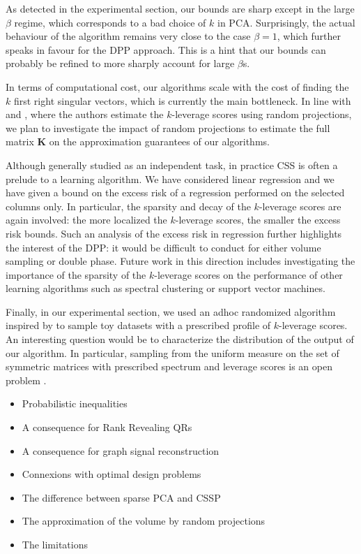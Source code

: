 \documentclass[twoside,11pt]{book}
\numberwithin{theorem}{chapter}
\numberwithin{definition}{chapter}
\numberwithin{proposition}{chapter}
\numberwithin{corollary}{chapter}
\numberwithin{example}{chapter}
\numberwithin{lemma}{chapter}
\numberwithin{assumption}{chapter}
\begin{document}
As detected in the experimental section, our bounds are sharp except in the large $\beta$ regime, which corresponds to a bad choice of $k$ in PCA. Surprisingly, the actual behaviour of the algorithm remains very close to the case $\beta=1$, which further speaks in favour for the DPP approach. This is a hint that our bounds can probably be refined to more sharply account for large $\beta$s.

In terms of computational cost, our algorithms scale with the cost of finding the $k$ first right singular vectors, which is currently the main bottleneck. In line with \cite{DMMW12} and \cite{BoDrMI11}, where the authors estimate the $k$-leverage scores using random projections, we plan to investigate the impact of random projections to estimate the full matrix $\bm{K}$ on the approximation guarantees of our algorithms.

Although generally studied as an independent task, in practice CSS is often a prelude to a learning algorithm. We have considered linear regression and we have given a bound on the excess risk of a regression performed on the selected columns only. In particular, the sparsity and decay of the $k$-leverage scores are again involved: the more localized the $k$-leverage scores, the smaller the excess risk bounds. Such an analysis of the excess risk in regression further highlights the interest of the DPP: it would be difficult to conduct for either volume sampling or double phase. Future work in this direction includes investigating the importance of the sparsity of the $k$-leverage scores on the performance of other learning algorithms such as spectral clustering or support vector machines.

Finally, in our experimental section, we used an adhoc randomized algorithm inspired by \cite{FMPS13} to sample toy datasets with a prescribed profile of $k$-leverage scores. An interesting question would be to characterize the distribution of the output of our algorithm. In particular, sampling from the uniform measure on the set of symmetric matrices with prescribed spectrum and leverage scores is an open problem \citep*{DhHeSuTr05}. %


\begin{itemize}
\item Probabilistic inequalities
\item A consequence for Rank Revealing QRs
\item A consequence for graph signal reconstruction
\item Connexions with optimal design problems
\item The difference between sparse PCA and CSSP
\item The approximation of the volume by random projections 
\item The limitations 
\end{itemize}
\end{document}
